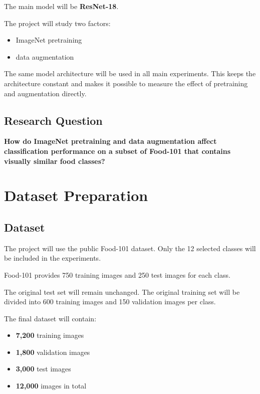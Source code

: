 \documentclass[11pt,a4paper]{article}
\begin{document}
The main model will be \textbf{ResNet-18}.

The project will study two factors:

\begin{itemize}
    \item ImageNet pretraining
    \item data augmentation
\end{itemize}

The same model architecture will be used in all main experiments. This keeps the
architecture constant and makes it possible to measure the effect of pretraining
and augmentation directly.

\subsection{Research Question}

\textbf{How do ImageNet pretraining and data augmentation affect classification
performance on a subset of Food-101 that contains visually similar food classes?}


\section{Dataset Preparation}

\subsection{Dataset}

The project will use the public Food-101 dataset. Only the 12 selected classes will
be included in the experiments.

Food-101 provides 750 training images and 250 test images for each class.

The original test set will remain unchanged. The original training set will be divided
into 600 training images and 150 validation images per class.

The final dataset will contain:

\begin{itemize}
    \item \textbf{7,200} training images
    \item \textbf{1,800} validation images
    \item \textbf{3,000} test images
    \item \textbf{12,000} images in total
\end{itemize}
\end{document}
